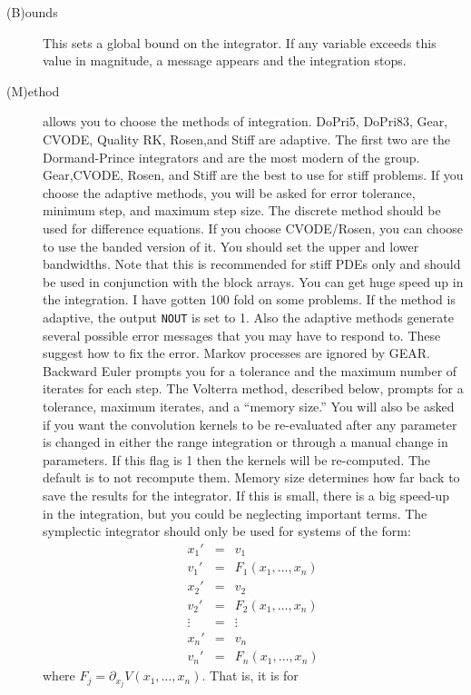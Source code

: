 \documentclass{article}
\newcommand{\tc}[1]{\addcontentsline{toc}{subsection}{#1}}
\begin{document}
\begin{description}
\item[(B)ounds]  This sets a global bound on the integrator.  If any variable exceeds
 this value in magnitude, a message appears and the integration stops.
\tc{Numerical method}\item[(M)ethod]  allows you to choose the methods of integration.
DoPri5, DoPri83, Gear, CVODE, Quality RK, Rosen,and Stiff  are
 adaptive. The first two are the Dormand-Prince integrators and are
the most modern of the group.
 Gear,CVODE, Rosen, and Stiff are the best to use for stiff problems.  If you choose
the adaptive methods, you will be
 asked for error tolerance, minimum step, and maximum step size.  The discrete
 method should be used for difference equations.  
If you choose CVODE/Rosen, you can choose to use the banded version of
it. You should set the upper and lower bandwidths. Note that this is
recommended for stiff PDEs only and should be used in conjunction with
the block arrays.  
You can get huge speed up in the integration. I have gotten 100
fold on some problems. If the method is
adaptive, the
 output {\tt NOUT} is set to 1.  Also the adaptive methods generate several possible error messages
 that you may have to respond to.  These suggest how to fix the error.
 Markov processes are ignored by GEAR.
 Backward Euler prompts you for a tolerance and the maximum number of iterates
 for each step. The Volterra method, described below, prompts for
a tolerance, maximum iterates, and a ``memory size.''   You will also
be asked if you want the convolution kernels to be re-evaluated after
any parameter is changed in either the range integration or through a
manual change in parameters.  If this flag is 1 then the kernels will
be re-computed.  The default is to not recompute them. Memory size
determines how far back to save the results for the integrator. If
this is small, there is a big speed-up in the integration, but you
could be neglecting important terms.  The symplectic integrator should
only be used for systems of the form:
\begin{eqnarray*}
x_1' &=& v_1 \\
v_1' &=& F_1(x_1,\ldots,x_n) \\
x_2' &=& v_2 \\
v_2' &=& F_2(x_1,\ldots,x_n) \\
\vdots &=& \vdots \\
x_n' &=& v_n \\
v_n' &=& F_n(x_1,\ldots,x_n)
\end{eqnarray*}
where $F_j = \partial_{x_j} V(x_1,\ldots,x_n).$  That is, it is for

\end{description}
\end{document}
